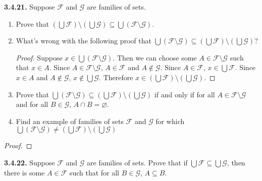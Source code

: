 \documentclass[12pt]{amsart}
\newenvironment{statement}[1]{\smallskip\noindent\color[rgb]{.6627, .3529, .6314} {\bf #1.}}{}
\theoremstyle{definition}
\theoremstyle{remark}
\begin{document}
\begin{statement}{3.4.21}
Suppose $\mathcal{F}$ and $\mathcal{G}$ are families of sets.
\begin{enumerate}
	\item Prove that $\left( \bigcup \mathcal{F} \right) \setminus \left( \bigcup \mathcal{G} \right)
	\subseteq \bigcup (\mathcal{F} \setminus \mathcal{G})$.
	
	\item What's wrong with the following proof that $\bigcup (\mathcal{F} \setminus \mathcal{G})
	\subseteq \left( \bigcup \mathcal{F} \right) \setminus \left( \bigcup \mathcal{G} \right)$?
	\begin{proof}
		Suppose $x \in \bigcup (\mathcal{F} \setminus \mathcal{G})$.
		Then we can choose some $A \in \mathcal{F} \setminus \mathcal{G}$ such that $x \in A$.
		Since $A \in \mathcal{F} \setminus \mathcal{G}$, 
		$A \in \mathcal{F}$ and $A \notin \mathcal{G}$.
		Since $A \in \mathcal{F}$, $x \in \bigcup \mathcal{F}$.
		Since $x \in A$ and $A \notin \mathcal{G}$, $x \notin \bigcup \mathcal{G}$.
		Therefore $x \in \left( \bigcup \mathcal{F} \right) \setminus
		\left( \bigcup \mathcal{G} \right)$.
	\end{proof}
	
	\item Prove that $\bigcup (\mathcal{F} \setminus \mathcal{G})
	\subseteq \left( \bigcup \mathcal{F} \right) \setminus \left( \bigcup \mathcal{G} \right)$
	if and only if for all $A \in \mathcal{F} \setminus \mathcal{G}$ and for all $B \in \mathcal{G}$,
	$A \cap B = \varnothing$.
	
	\item Find an example of families of sets $\mathcal{F}$ and $\mathcal{G}$ for which
	$\bigcup (\mathcal{F} \setminus \mathcal{G})
	\neq \left( \bigcup \mathcal{F} \right) \setminus \left( \bigcup \mathcal{G} \right)$
\end{enumerate}
\end{statement}

\begin{proof}
\end{proof}


\begin{statement}{3.4.22}
Suppose $\mathcal{F}$ and $\mathcal{G}$ are families of sets.
Prove that if $\bigcup \mathcal{F} \subseteq \bigcup \mathcal{G}$, then there is some $A \in \mathcal{F}$ such that for all $B \in \mathcal{G}$, $A \subseteq B$.
\end{statement}
\end{document}
